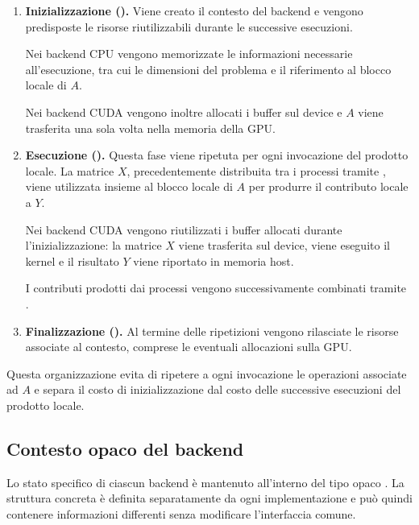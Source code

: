 \begin{enumerate}

    \item \textbf{Inizializzazione ().}
    Viene creato il contesto del backend e vengono predisposte le
    risorse riutilizzabili durante le successive esecuzioni.
    
    Nei backend CPU vengono memorizzate le informazioni necessarie
    all'esecuzione, tra cui le dimensioni del problema e il riferimento
    al blocco locale di $A$.
    
    Nei backend CUDA vengono inoltre allocati i buffer sul device e
    $A$ viene trasferita una sola volta nella memoria della GPU.

    \item \textbf{Esecuzione ().}
    Questa fase viene ripetuta per ogni invocazione del prodotto
    locale. La matrice $X$, precedentemente distribuita tra i processi tramite
    , viene utilizzata insieme al blocco locale di $A$
    per produrre il contributo locale a $Y$.
    
    Nei backend CUDA vengono riutilizzati i buffer allocati durante
    l'inizializzazione: la matrice $X$ viene trasferita sul device, viene eseguito
    il kernel e il risultato $Y$ viene riportato in memoria host.
    
    I contributi prodotti dai processi vengono successivamente
    combinati tramite .

    \item \textbf{Finalizzazione ().}
    Al termine delle ripetizioni vengono rilasciate le risorse
    associate al contesto, comprese le eventuali allocazioni sulla GPU.

\end{enumerate}

Questa organizzazione evita di ripetere a ogni invocazione le
operazioni associate ad $A$ e separa il costo di inizializzazione
dal costo delle successive esecuzioni del prodotto locale.

\subsection{Contesto opaco del backend}

Lo stato specifico di ciascun backend è mantenuto all'interno del 
tipo opaco . La struttura concreta è definita
separatamente da ogni implementazione e può quindi contenere
informazioni differenti senza modificare l'interfaccia comune.

